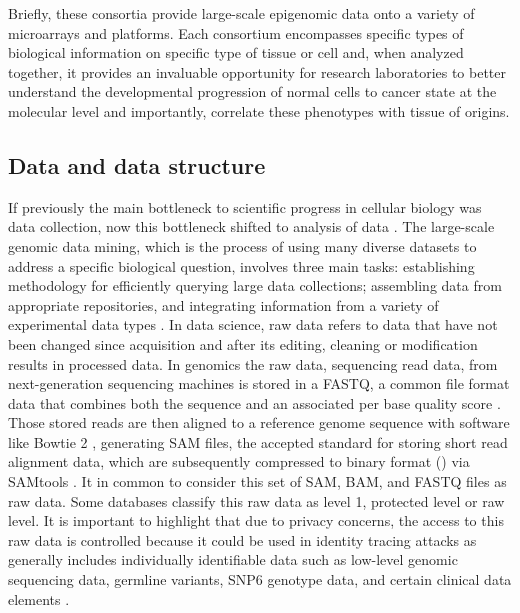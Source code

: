  Briefly, these consortia provide large-scale epigenomic data onto a variety of microarrays and  platforms. Each consortium encompasses specific types of biological information on specific type of tissue or cell and, when analyzed together, it provides an invaluable opportunity for research laboratories to better understand the developmental progression of normal cells to cancer state at the molecular level and importantly, correlate these phenotypes with tissue of origins.

\subsection{Data and data structure} \label{susec:structure}

If previously the main bottleneck to scientific progress in cellular biology was data collection, now this
 bottleneck shifted to analysis of data \cite{mcpherson2009next}.
 The large-scale genomic data mining, which is the process of using many diverse datasets to address a specific biological question, involves three main tasks: establishing methodology for efficiently querying large data collections; assembling data from appropriate repositories, and integrating information from a variety of experimental data types \cite{huttenhower2010quick}.
In data science, raw data refers to data that have not been changed since acquisition and after its editing, cleaning or modification results in processed data. In genomics the raw data, sequencing read data,
 from next-generation sequencing machines is stored in a FASTQ,
 a common file format data that combines both the sequence and an associated per base quality score \cite{cock2009sanger}.
 Those stored reads are then aligned to a reference genome sequence with software like Bowtie 2 \cite{langmead2012fast},
generating SAM files, the accepted standard for storing short read alignment data, which are subsequently compressed to binary  format () via SAMtools \cite{li2009sequence}. It in common to consider this set of SAM, BAM, and FASTQ files as raw data. Some databases classify this raw data as level 1, protected level or raw level.
It is important to highlight that due to privacy concerns, the access to this raw data is controlled
because it could be used in identity tracing attacks \cite{erlich2014routes,ayday2014privacy} as
generally includes individually identifiable data such as low-level genomic sequencing data, germline variants, SNP6 genotype data, and certain clinical data elements \cite{GDC_data}.

